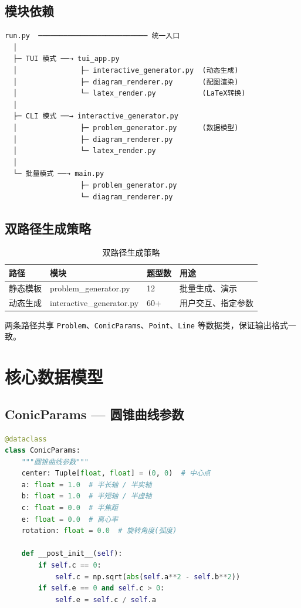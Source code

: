\documentclass[11pt,a4paper]{article}
\begin{document}
\subsection{模块依赖}

\begin{verbatim}
run.py  ────────────────────────── 统一入口
  │
  ├─ TUI 模式 ──→ tui_app.py
  │               ├─ interactive_generator.py  (动态生成)
  │               ├─ diagram_renderer.py       (配图渲染)
  │               └─ latex_render.py           (LaTeX转换)
  │
  ├─ CLI 模式 ──→ interactive_generator.py
  │               ├─ problem_generator.py      (数据模型)
  │               ├─ diagram_renderer.py
  │               └─ latex_render.py
  │
  └─ 批量模式 ──→ main.py
                  ├─ problem_generator.py
                  └─ diagram_renderer.py
\end{verbatim}

\subsection{双路径生成策略}

\begin{table}[h]
\centering
\begin{tabular}{llll}
\toprule
路径 & 模块 & 题型数 & 用途 \\
\midrule
静态模板 & problem\_generator.py & 12 & 批量生成、演示 \\
动态生成 & interactive\_generator.py & 60+ & 用户交互、指定参数 \\
\bottomrule
\end{tabular}
\caption{双路径生成策略}
\end{table}

\begin{notebox}
两条路径共享 \texttt{Problem}、\texttt{ConicParams}、\texttt{Point}、\texttt{Line} 等数据类，保证输出格式一致。
\end{notebox}

\section{核心数据模型}

\subsection{ConicParams — 圆锥曲线参数}

\begin{lstlisting}[language=Python]
@dataclass
class ConicParams:
    """圆锥曲线参数"""
    center: Tuple[float, float] = (0, 0)  # 中心点
    a: float = 1.0  # 半长轴 / 半实轴
    b: float = 1.0  # 半短轴 / 半虚轴
    c: float = 0.0  # 半焦距
    e: float = 0.0  # 离心率
    rotation: float = 0.0  # 旋转角度(弧度)

    def __post_init__(self):
        if self.c == 0:
            self.c = np.sqrt(abs(self.a**2 - self.b**2))
        if self.e == 0 and self.c > 0:
            self.e = self.c / self.a
\end{lstlisting}
\end{document}
